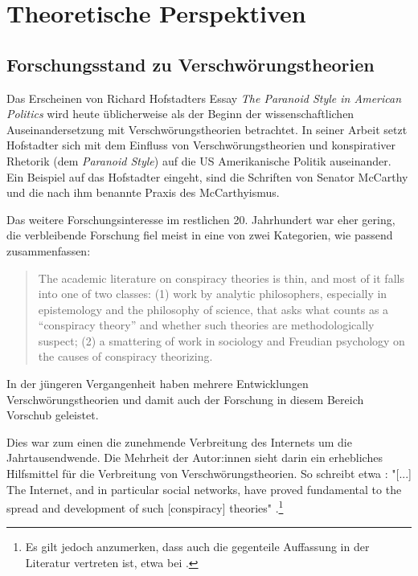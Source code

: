 \section{Theoretische Perspektiven}

\subsection{Forschungsstand zu Verschwörungstheorien}

Das Erscheinen von Richard Hofstadters Essay \textit{The Paranoid Style in American Politics} \parencite[][]{hofstadter_2008} wird heute üblicherweise als der Beginn der wissenschaftlichen Auseinandersetzung mit Verschwörungstheorien betrachtet.
In seiner Arbeit setzt Hofstadter sich mit dem Einfluss von Verschwörungstheorien und konspirativer Rhetorik (dem \textit{Paranoid Style}) auf die US Amerikanische Politik auseinander.
Ein Beispiel auf das Hofstadter eingeht, sind die Schriften von Senator McCarthy und die nach ihm benannte Praxis des McCarthyismus.

Das weitere Forschungsinteresse im restlichen 20. Jahrhundert war eher gering, die verbleibende Forschung fiel meist in eine von zwei Kategorien, wie \textcite{sunstein_2008} passend zusammenfassen:

\begin{quotation}
    The academic literature on conspiracy theories is thin, and most of it falls into one 
    of two classes: (1) work by analytic philosophers, especially in epistemology and the 
    philosophy of science, that asks what counts as a “conspiracy theory” and whether such theories are methodologically suspect; (2) a smattering of work in sociology and Freudian psychology on the causes of conspiracy theorizing. \parencite[][2]{sunstein_2008}
\end{quotation}

In der jüngeren Vergangenheit haben mehrere Entwicklungen Verschwörungstheorien und damit auch der Forschung in diesem Bereich Vorschub geleistet.

Dies war zum einen die zunehmende Verbreitung des Internets um die Jahrtausendwende.
Die Mehrheit der Autor:innen sieht darin ein erhebliches Hilfsmittel für die Verbreitung von Verschwörungstheorien.
So schreibt etwa \textcite{stano_2020}: "[...] The Internet, and in particular social networks, have proved fundamental to the spread and development of such [conspiracy] theories" \parencite[][492]{stano_2020}.\footnote{Es gilt jedoch anzumerken, dass auch die gegenteile Auffassung in der Literatur vertreten ist, etwa bei \textcite{clarke_2007}.}

